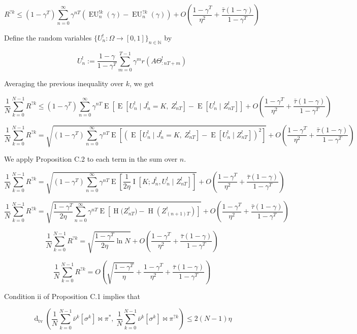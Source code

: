 \documentclass[a4paper]{article}
\newcommand{\E}[1]{\underset{#1}{\operatorname{E}}}
\newcommand{\I}[1]{\underset{#1}{\operatorname{I}}}
\newcommand{\En}{\operatorname{H}}
\newcommand{\Dtv}{\operatorname{d}_{\text{tv}}}
\newcommand{\Nats}{\mathbb{N}}
\newcommand{\Sq}[2]{\{#1\}_{#2 \in \Nats}}
\newcommand{\Sqn}[1]{\Sq{#1}{n}}
\newcommand{\EU}{\operatorname{EU}}
\newcommand{\J}{J}
\begin{document}
$$R^{?k} \leq (1-\gamma^T)\sum_{n=0}^\infty \gamma^{nT} \left(\EU^{!k}_n(\gamma)-\EU^{?k}_n(\gamma)\right) + O\left(\frac{1-\gamma^T}{\eta^2}+\frac{\bar{\tau}(1-\gamma)}{1-\gamma^T}\right)$$

Define the random variables $\Sqn{U^!_n : \Omega \rightarrow [0,1]}$ by 

$$U^!_n:=\frac{1-\gamma}{1-\gamma^T}\sum_{m=0}^{T-1} \gamma^{m} r\left(A\Theta^!_{:nT+m}\right)$$

Averaging the previous inequality over $k$, we get

$$\frac{1}{N}\sum_{k=0}^{N-1}R^{?k} \leq (1-\gamma^T)\sum_{n=0}^\infty \gamma^{nT} \E{}\left[\E{}\left[U^!_n \mid \J^!_n = K,\ Z^!_{nT}\right]-\E{}\left[U^!_n \mid Z^!_{nT}\right]\right] + O\left(\frac{1-\gamma^T}{\eta^2}+\frac{\bar{\tau}(1-\gamma)}{1-\gamma^T}\right)$$


$$\frac{1}{N}\sum_{k=0}^{N-1}R^{?k} = \sqrt{(1-\gamma^T)\sum_{n=0}^\infty \gamma^{nT} \E{}\left[\left(\E{}\left[U^!_n \mid \J^!_n = K,\ Z^!_{nT}\right]-\E{}\left[U^!_n \mid Z^!_{nT}\right]\right)^2\right]} + O\left(\frac{1-\gamma^T}{\eta^2}+\frac{\bar{\tau}(1-\gamma)}{1-\gamma^T}\right)$$

We apply Proposition C.2 to each term in the sum over $n$.

$$\frac{1}{N}\sum_{k=0}^{N-1}R^{?k} = \sqrt{(1-\gamma^T)\sum_{n=0}^\infty \gamma^{nT} \E{}\left[\frac{1}{2\eta}\I{}\left[K;\J^!_n,U^!_n \mid Z^!_{nT}\right]\right]} + O\left(\frac{1-\gamma^T}{\eta^2}+\frac{\bar{\tau}(1-\gamma)}{1-\gamma^T}\right)$$

$$\frac{1}{N}\sum_{k=0}^{N-1}R^{?k} = \sqrt{\frac{1-\gamma^T}{2\eta}\sum_{n=0}^\infty \gamma^{nT} \E{}\left[\En\Big(Z^!_{nT}\Big)-\En\left(Z^!_{(n+1)T}\right)\right]} + O\left(\frac{1-\gamma^T}{\eta^2}+\frac{\bar{\tau}(1-\gamma)}{1-\gamma^T}\right)$$

$$\frac{1}{N}\sum_{k=0}^{N-1}R^{?k} = \sqrt{\frac{1-\gamma^T}{2\eta}\ln N} + O\left(\frac{1-\gamma^T}{\eta^2}+\frac{\bar{\tau}(1-\gamma)}{1-\gamma^T}\right)$$

$$\frac{1}{N}\sum_{k=0}^{N-1}R^{?k} = O\left(\sqrt{\frac{1-\gamma^T}{\eta}} +\frac{1-\gamma^T}{\eta^2}+\frac{\bar{\tau}(1-\gamma)}{1-\gamma^T}\right)$$

Condition ii of Proposition C.1 implies that

$$\Dtv\left(\frac{1}{N}\sum_{k=0}^{N-1}{\bar{\nu}^k\left[\sigma^k\right]\bowtie\pi^*},\ \frac{1}{N}\sum_{k=0}^{N-1}{\bar{\nu}^k\left[\sigma^k\right]\bowtie\pi^{?k}}\right) \leq 2(N-1)\eta$$
\end{document}
